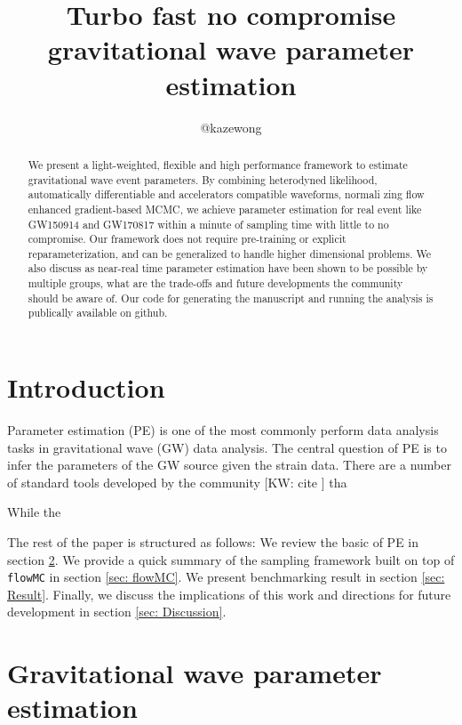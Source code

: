 \documentclass[twocolumn]{aastex631}
\newcommand{\kw}[1]{{\color{rb4}[KW: #1 ]}}
\begin{document}
\title{Turbo fast no compromise gravitational wave parameter estimation}

\author{@kazewong}

\begin{abstract}
We present a light-weighted, flexible and high performance framework to estimate
gravitational wave event parameters. By combining heterodyned likelihood,
automatically differentiable and accelerators compatible waveforms, normali zing
flow enhanced gradient-based MCMC, we achieve parameter estimation for real
event like GW150914 and GW170817 within a minute of sampling time with little to
no compromise. Our framework does not require pre-training or explicit
reparameterization, and can be generalized to handle higher dimensional
problems. We also discuss as near-real time parameter estimation have been shown
to be possible by multiple groups, what are the trade-offs and future
developments the community should be aware of. Our code for generating the
manuscript and running the analysis is publically available on github.
\end{abstract}

\section{Introduction}
\label{sec:intro}

Parameter estimation (PE) is one of the most commonly perform data analysis
tasks in gravitational wave (GW) data analysis. The central question of PE is to
infer the parameters of the GW source given the strain data. There are a number
of standard tools developed by the community \kw{cite} tha

While the



The rest of the paper is structured as follows: We review the basic of PE in
section \ref{sec: PE}. We provide a quick summary of the sampling framework
built on top of \texttt{flowMC} in section \ref{sec: flowMC}. We present
benchmarking result in section \ref{sec: Result}. Finally, we discuss the
implications of this work and directions for future development in section
\ref{sec: Discussion}.

\section{Gravitational wave parameter estimation}
\label{sec: PE}
\end{document}
